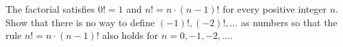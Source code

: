The factorial satisfies $0!=1$ and $n!=n\cdot(n-1)!$ for every positive integer $n$. Show that there is no way to define $(-1)!,(-2)!,\dots$ as numbers so that the rule $n!=n\cdot(n-1)!$ also holds for $n=0,-1,-2,\dots$.
